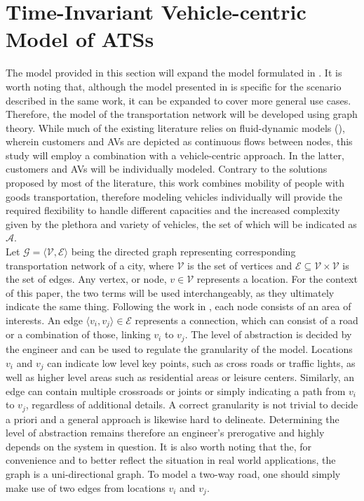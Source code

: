 \section{Time-Invariant Vehicle-centric Model of ATSs}\label{sec:vc_model}
The model provided in this section will expand the model formulated in \cite{project_thesis}. It is worth noting that, although the model presented in \cite{project_thesis} is specific for the scenario described in the same work, it can be expanded to cover more general use cases.
Therefore, the model of the transportation network will be developed using graph theory. While much of the existing literature relies on fluid-dynamic models (\cite{amod_review}), wherein customers and AVs are depicted as continuous flows between nodes, this study will employ a combination with a vehicle-centric approach. In the latter, customers and AVs will be individually modeled. Contrary to the solutions proposed by most of the literature, this work combines mobility of people with goods transportation, therefore modeling vehicles individually will provide the required flexibility to handle different capacities and the increased complexity given by the plethora and variety of vehicles, the set of which will be indicated as $\mathcal{A}$. \\ 
Let $\mathcal{G} = \langle \mathcal{V}, \mathcal{E} \rangle$ being the directed graph representing corresponding transportation network of a city, where $\mathcal{V}$ is the set of vertices and $\mathcal{E} \subseteq \mathcal{V} \times \mathcal{V}$ is the set of edges. Any vertex, or node, $ v \in \mathcal{V}$ represents a location. For the context of this paper, the two terms will be used interchangeably, as they ultimately indicate the same thing. Following the work in \cite{project_thesis}, each node consists of an area of interests. An edge $\langle v_i, v_j \rangle \in \mathcal{E}$ represents a connection, which can consist of a road or a combination of those, linking $v_i$ to $v_j$. The level of abstraction is decided by the engineer and can be used to regulate the granularity of the model. Locations $v_i$ and $v_j$ can indicate low level key points, such as cross roads or traffic lights, as well as higher level areas such as residential areas or leisure centers. Similarly, an edge can contain multiple crossroads or joints or simply indicating a path from $v_i$ to $v_j$, regardless of additional details. A correct granularity is not trivial to decide a priori and a general approach is likewise hard to delineate. Determining the level of abstraction remains therefore an engineer's prerogative and highly depends on the system in question. It is also worth noting that the, for convenience and to better reflect the situation in real world applications, the graph is a uni-directional graph. To model a two-way road, one should simply make use of two edges from locations $v_i$ and $v_j$. \\
